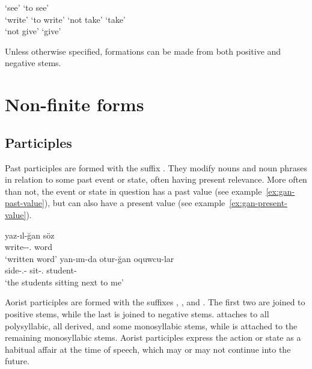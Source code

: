 \begin{lingexample}
	\ex \label{ex:positive-stem-formation}  `see' \derivedfrom{}  `to see' \\
		 `write' \derivedfrom{}  `to write'
	\ex \label{ex:negative-stem-formation}  `not take' \derivedfrom{}  `take' \\
		 `not give' \derivedfrom{}  `give'
\end{lingexample}

Unless otherwise specified, formations can be made from both positive and negative stems.

\section{Non-finite forms}

\subsection{Participles}

Past participles are formed with the suffix .
They modify nouns and noun phrases in relation to some past event or state, often having present relevance.
More often than not, the event or state in question has a past value (see example~\ref{ex:gan-past-value}), but can also have a present value (see example~\ref{ex:gan-present-value}).

\begin{lingexample}
	\ex \label{ex:gan-past-value} \gll yaz-ıl-ğan söz \\
		write-\Pass{}-\Ptcp{}.\Pst{} word \\
		\glt `written word'
	\ex \label{ex:gan-present-value} \gll yan-ım-da otur-ğan oquwcu-lar \\
		side-\Poss{}.\Fsg{}-\Loc{} sit-\Ptcp{}.\Pst{} student-\Pl{} \\
		\glt `the students sitting next to me'
\end{lingexample}

Aorist participles are formed with the suffixes , , and .
The first two are joined to positive stems, while the last is joined to negative stems.
 attaches to all polysyllabic, all derived, and some monosyllabic stems, while  is attached to the remaining monosyllabic stems.
Aorist participles express the action or state as a habitual affair at the time of speech, which may or may not continue into the future.

